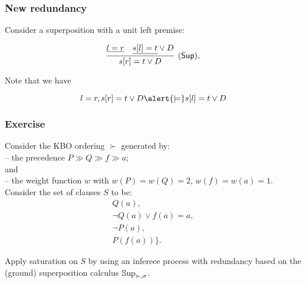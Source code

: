       \begin{frame}\frametitle{New redundancy}

Consider a superposition with a unit left premise:

 \[
    \infer[(\ruleSup),]{
      s[r] \eql t \orl D
      }{
      \underline{l \eql r}
      &
      \underline{s[l] \eql t} \orl D
    }
 \]

Note that we have

 \[
     l \eql r,
      s[r] \eql t \orl D
     \alert{\models}
      s[l] \eql t \orl D
\]



\medskip



                               \end{frame}



\begin{frame}
\frametitle{Exercise}
Consider the KBO ordering $\succ$ generated by:\\[.5em]

-- the precedence $ P\gg Q\gg f\gg a$;\\[.5em]

and\\[.5em]

-- the weight function $w$ with $w(P)=w(Q)=2$, $w(f)=w(a)=1$.\\[1em]


Consider the set of clauses $S$ to be: 
\[\begin{array}{l}
{Q(a)},\\
 {\neg Q(a)}\vee f(a)=a, \\ 
 {\neg P(a)},\\ {P(f(a))}\}.
\end{array}\] 

Apply saturation on $S$ by using an inferece process with redundancy
based on the (ground) superposition calculus $\mathbb{S}\mathrm{up}_{\succ,\sigma}$. 
\end{frame}





